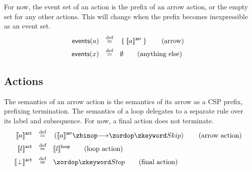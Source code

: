 \begin{defn}
For now, the event set of an action is the prefix of an arrow action, or
the empty set for any other actions.  This will change when the prefix becomes
inexpressible as an event set.
%
\begin{align*}
	\mathsf{events}(a)
	\quad\mathbin{\overset{\text{def}}=}\quad&
	\Set{\llbracket a\rrbracket^{\mathsf{arr}}}
	\tag{arrow}
\\
	\mathsf{events}(x)
	\quad\mathbin{\overset{\text{def}}=}\quad&
	\emptyset
	\tag{anything else}
\end{align*}
\end{defn}

\subsection{Actions}

\begin{defn}[Actions]

The semantics of an arrow action is the semantics of its arrow as a CSP prefix,
prefixing termination.  The semantics of a loop delegates to a separate rule
over its label and subsequence.
For now, a final action does not terminate.
%
\begin{align*}
	\actsema{\anarrow}
	\quad\defeq\quad&
	\left(
	\arrsema{\anarrow}
	\then
	\Skip
	\right)
	\tag{arrow action}
\\
	\actsema{\aloop}
\quad\defeq\quad&
	\loopsema{\aloop}
\tag{loop action}
\\
	\actsema{\bot}
\quad\defeq\quad&
	\Stop
\tag{final action}
\end{align*}

\end{defn}


